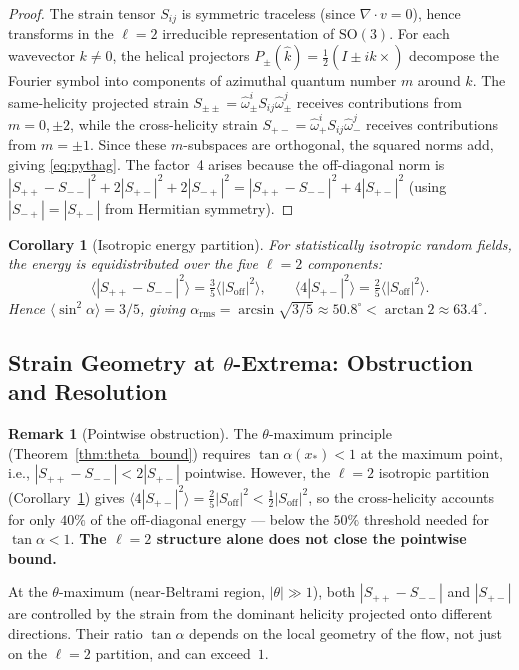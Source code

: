 \documentclass[12pt,a4paper]{article}
\newtheorem{corollary}[theorem]{Corollary}
\theoremstyle{definition}
\newtheorem{remark}[theorem]{Remark}
\begin{document}
\begin{proof}
The strain tensor $S_{ij}$ is symmetric traceless (since $\nabla\cdot v=0$),
hence transforms in the $\ell=2$ irreducible representation of $\mathrm{SO}(3)$.
For each wavevector $k\neq 0$, the helical projectors
$P_\pm(\hat{k})=\frac{1}{2}(I\pm i\hat{k}\times)$ decompose the Fourier
symbol into components of azimuthal quantum number $m$ around $\hat{k}$.
The same-helicity projected strain $S_{\pm\pm}=\hat{\omega}_\pm^i S_{ij}\hat{\omega}_\pm^j$
receives contributions from $m=0,\pm 2$, while the cross-helicity strain
$S_{+-}=\hat{\omega}_+^i S_{ij}\hat{\omega}_-^j$ receives contributions from $m=\pm 1$.
Since these $m$-subspaces are orthogonal, the squared norms add, giving
\eqref{eq:pythag}. The factor~4 arises because the off-diagonal norm is
$|S_{++}-S_{--}|^2+2|S_{+-}|^2+2|S_{-+}|^2=|S_{++}-S_{--}|^2+4|S_{+-}|^2$
(using $|S_{-+}|=|S_{+-}|$ from Hermitian symmetry).
\end{proof}

\begin{corollary}[Isotropic energy partition]\label{cor:iso}
For statistically isotropic random fields, the energy is equidistributed over
the five $\ell=2$ components:
\begin{equation}
\langle |S_{++}-S_{--}|^2\rangle = \tfrac{3}{5}\langle|S_{\mathrm{off}}|^2\rangle,\qquad
\langle 4|S_{+-}|^2\rangle = \tfrac{2}{5}\langle|S_{\mathrm{off}}|^2\rangle.
\end{equation}
Hence $\langle\sin^2\alpha\rangle=3/5$, giving
$\alpha_{\mathrm{rms}}=\arcsin\sqrt{3/5}\approx 50.8^\circ < \arctan 2\approx 63.4^\circ$.
\end{corollary}

\subsection{Strain Geometry at $\theta$-Extrema: Obstruction and Resolution}

\begin{remark}[Pointwise obstruction]\label{rmk:obstruction}
The $\theta$-maximum principle (Theorem~\ref{thm:theta_bound}) requires
$\tan\alpha(x_*)<1$ at the maximum point, i.e.,
$|S_{++}-S_{--}|<2|S_{+-}|$ pointwise.
However, the $\ell=2$ isotropic partition (Corollary~\ref{cor:iso}) gives
$\langle 4|S_{+-}|^2\rangle=\frac{2}{5}|S_{\mathrm{off}}|^2<\frac{1}{2}|S_{\mathrm{off}}|^2$,
so the cross-helicity accounts for only $40\%$ of the off-diagonal energy
--- below the $50\%$ threshold needed for $\tan\alpha<1$.
\textbf{The $\ell=2$ structure alone does not close the pointwise bound.}

At the $\theta$-maximum (near-Beltrami region, $|\theta|\gg 1$),
both $|S_{++}-S_{--}|$ and $|S_{+-}|$ are controlled by the strain
from the dominant helicity projected onto different directions.
Their ratio $\tan\alpha$ depends on the local geometry of the flow,
not just on the $\ell=2$ partition, and can exceed~$1$.
\end{remark}
\end{document}

